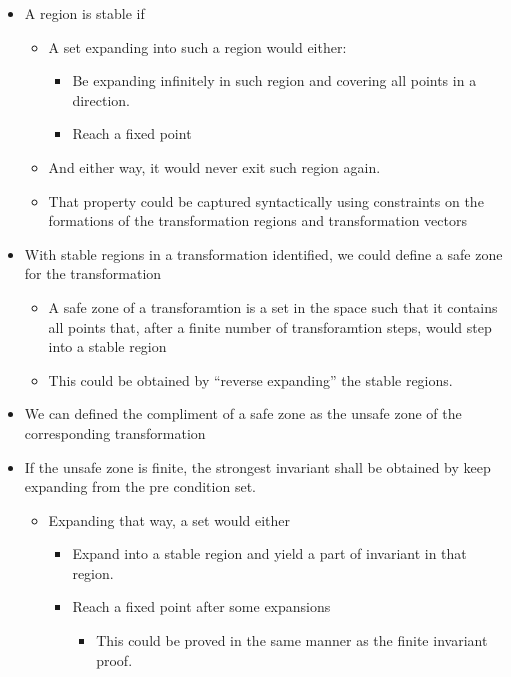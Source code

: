 \documentclass[letterpaper,]{article}
\providecommand{\tightlist}{%
  \setlength{\itemsep}{0pt}\setlength{\parskip}{0pt}}
\begin{document}
\begin{itemize}
\tightlist
\item
  A region is stable if

  \begin{itemize}
  \tightlist
  \item
    A set expanding into such a region would either:

    \begin{itemize}
    \tightlist
    \item
      Be expanding infinitely in such region and covering all points in
      a direction.
    \item
      Reach a fixed point
    \end{itemize}
  \item
    And either way, it would never exit such region again.
  \item
    That property could be captured syntactically using constraints on
    the formations of the transformation regions and transformation
    vectors
  \end{itemize}
\item
  With stable regions in a transformation identified, we could define a
  safe zone for the transformation

  \begin{itemize}
  \tightlist
  \item
    A safe zone of a transforamtion is a set in the space such that it
    contains all points that, after a finite number of transforamtion
    steps, would step into a stable region
  \item
    This could be obtained by ``reverse expanding'' the stable regions.
  \end{itemize}
\item
  We can defined the compliment of a safe zone as the unsafe zone of the
  corresponding transformation
\item
  If the unsafe zone is finite, the strongest invariant shall be
  obtained by keep expanding from the pre condition set.

  \begin{itemize}
  \tightlist
  \item
    Expanding that way, a set would either

    \begin{itemize}
    \tightlist
    \item
      Expand into a stable region and yield a part of invariant in that
      region.
    \item
      Reach a fixed point after some expansions

      \begin{itemize}
      \tightlist
      \item
        This could be proved in the same manner as the finite invariant
        proof.
      \end{itemize}
    \end{itemize}
  \end{itemize}
\end{itemize}
\end{document}
